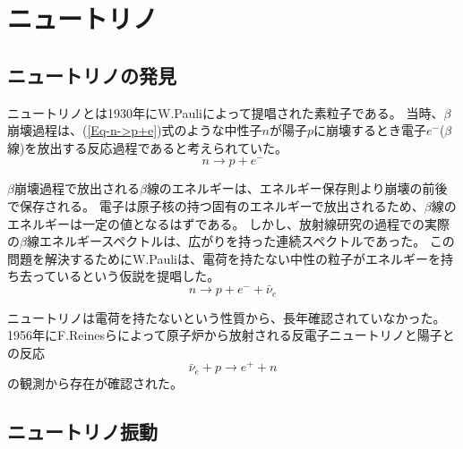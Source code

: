\documentclass[a4paper,10pt]{jreport}
\begin{document}
\section{ニュートリノ}



\subsection{ニュートリノの発見}

ニュートリノとは1930年にW.Pauliによって提唱された素粒子である。
当時、$\beta$崩壊過程は、(\ref{Eq-n->p+e})式のような中性子$n$が陽子$p$に崩壊するとき電子$e^-$($\beta$線)を放出する反応過程であると考えられていた。
\begin{equation} \label{Eq-n->p+e}
	n \to p+e^-
\end{equation}

$\beta$崩壊過程で放出される$\beta$線のエネルギーは、エネルギー保存則より崩壊の前後で保存される。
電子は原子核の持つ固有のエネルギーで放出されるため、$\beta$線のエネルギーは一定の値となるはずである。
しかし、放射線研究の過程での実際の$\beta$線エネルギースペクトルは、広がりを持った連続スペクトルであった。
この問題を解決するためにW.Pauliは、電荷を持たない中性の粒子がエネルギーを持ち去っているという仮説を提唱した。\cite{Pauli}
\begin{equation} \label{Eq-n->p+e+nu}
	n \to p+e^-+\bar{\nu}_e
\end{equation}

ニュートリノは電荷を持たないという性質から、長年確認されていなかった。
1956年にF.Reinesらによって原子炉から放射される反電子ニュートリノと陽子との反応
\begin{equation}
	\bar{\nu}_e +p \to e^+ +n
\end{equation}
の観測から存在が確認された。



\subsection{ニュートリノ振動}
\end{document}
